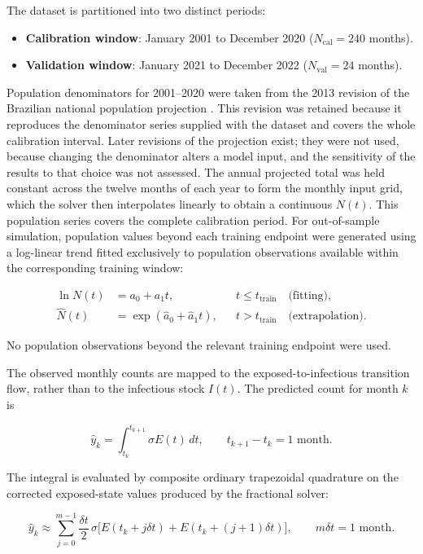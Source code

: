 \documentclass[pdflatex,sn-mathphys-ay,lineno]{sn-jnl}
\begin{document}
The dataset is partitioned into two distinct periods:

\begin{itemize}
\item \textbf{Calibration window}: January 2001 to December 2020 ($N_{\text{cal}} = 240$ months).
\item \textbf{Validation window}: January 2021 to December 2022 ($N_{\text{val}} = 24$ months).
\end{itemize}

Population denominators for 2001--2020 were taken from the 2013 revision of the Brazilian national population projection \citep{ibge2013}. This revision was retained because it reproduces the denominator series supplied with the dataset and covers the whole calibration interval. Later revisions of the projection exist; they were not used, because changing the denominator alters a model input, and the sensitivity of the results to that choice was not assessed. The annual projected total was held constant across the twelve months of each year to form the monthly input grid, which the solver then interpolates linearly to obtain a continuous $N(t)$. This population series covers the complete calibration period. For out-of-sample simulation, population values beyond each training endpoint were generated using a log-linear trend fitted exclusively to population observations available within the corresponding training window:

\[
\begin{aligned}
\ln N(t)&=a_0+a_1t, &&t\le t_{\mathrm{train}}\quad\text{(fitting)},\\
\widehat N(t)&=\exp(\widehat a_0+\widehat a_1t), &&t>t_{\mathrm{train}}\quad\text{(extrapolation)}.
\end{aligned}
\]

No population observations beyond the relevant training endpoint were used.

The observed monthly counts are mapped to the exposed-to-infectious transition flow, rather than to the infectious stock $I(t)$. The predicted count for month $k$ is

\[
\widehat y_k=\int_{t_k}^{t_{k+1}}\sigma E(t)\,dt,\qquad t_{k+1}-t_k=1\text{ month}.
\]

The integral is evaluated by composite ordinary trapezoidal quadrature on the corrected exposed-state values produced by the fractional solver:

\[
\widehat y_k\approx\sum_{j=0}^{m-1}\frac{\delta t}{2}\,\sigma\bigl[E(t_k+j\delta t)+E(t_k+(j+1)\delta t)\bigr],\qquad m\delta t=1\text{ month}.
\]
\end{document}
